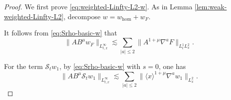 \documentclass[11pt,twoside]{article}
\def\ls{\lesssim}
\theoremstyle{plain}
\theoremstyle{definition}
\theoremstyle{assumption}
\numberwithin{equation}{section}
\begin{document}
	\begin{proof}
		We first prove \eqref{eq:weighted-Linfty-L2-w}. As in Lemma \ref{lem:weak-weighted-Linfty-L2}, decompose
		$w=w_{\mathrm{hom}}+w_F$.
		
		It follows from  \eqref{eq:Srho-basic-w} that
		\begin{equation}\label{eq:wF-zero-order-w}
			\|A B^\mu w_F\|_{L^\infty_{t,x}}
			\ls
			\sum_{|a|\le2}
			\|A^{1+\mu}\nabla^a F\|_{L^1_tL^2_x}.
		\end{equation}
		
		For the term $\mathcal{S}_{t} w_1$, by \eqref{eq:Srho-basic-w} with $s=0$,
		one has
		\begin{equation}\label{eq:St-w1-w}
			\|A B^\mu \mathcal{S}_{t} w_1\|_{L^\infty_{t,x}}
			\ls
			\sum_{|a|\le2}
			\|\langle x\rangle^{1+\mu}\nabla^a w_1\|_{L^2_x}.
		\end{equation}
		

\end{proof}
\end{document}
